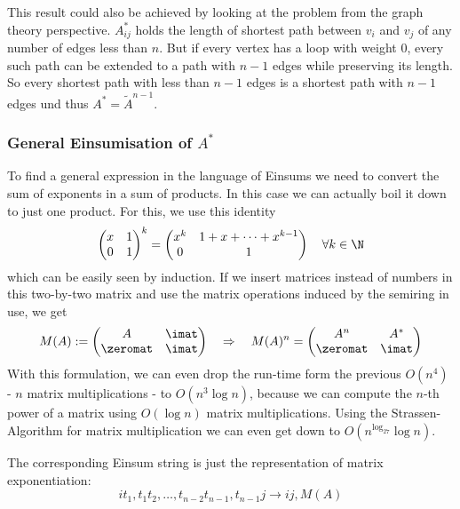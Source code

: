 This result could also be achieved by looking at the problem from the graph theory perspective. $A^*_{ij}$ holds the length of shortest path between $v_i$ and $v_j$ of any number of edges less than $n$. But if every vertex has a loop with weight 0, every such path can be extended to a path with $n-1$ edges while preserving its length. So every shortest path with less than $n-1$ edges is a shortest path with $n-1$ edges und thus $A^* = \tilde A^{n-1}$.

\subsubsection{General Einsumisation of $A^*$}
To find a general expression in the language of Einsums we need to convert the sum of exponents in a sum of products. In this case we can actually boil it down to just one product. For this, we use this identity
$$\left(\begin{matrix}
    x & 1\\
    0 & 1
\end{matrix}\right)^k = \left(\begin{matrix}
    x^k & 1 + x + \dots + x^{k-1} \\
    0 & 1
\end{matrix}\right) \quad \forall k \in \N$$
which can be easily seen by induction. If we insert matrices instead of numbers in this two-by-two matrix and use the matrix operations induced by the semiring in use, we get
$$M(A) := \left(\begin{matrix}
    A & \imat\\
    \zeromat & \imat
\end{matrix}\right) \quad\Rightarrow\quad M(A)^n = \left(\begin{matrix}
    A^n & A^* \\
    \zeromat & \imat
\end{matrix}\right)$$
With this formulation, we can even drop the run-time form the previous $O(n^4)$ - $n$ matrix multiplications - to $O(n^3 \log n)$, because we can compute the $n$-th power of a matrix using $O(\log n)$ matrix multiplications. Using the Strassen-Algorithm for matrix multiplication we can even get down to $O(n^{\log_27}\log n)$.

The corresponding Einsum string is just the representation of matrix exponentiation:
$$it_1,t_1t_2,\dots, t_{n-2}t_{n-1},t_{n-1}j \rightarrow ij, M(A)$$

